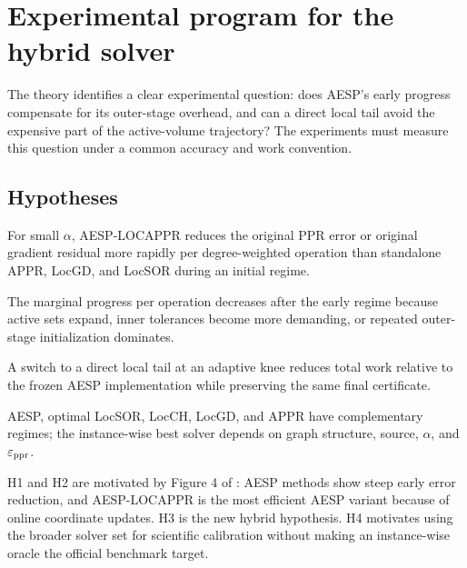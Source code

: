 \section{Experimental program for the hybrid solver}
\label{sec:experiments}

The theory identifies a clear experimental question: does AESP's early
progress compensate for its outer-stage overhead, and can a direct local tail
avoid the expensive part of the active-volume trajectory?  The experiments
must measure this question under a common accuracy and work convention.

\subsection{Hypotheses}

\begin{description}[leftmargin=2.9cm,style=nextline]
\item[H1: early AESP advantage.]
For small \(\alpha\), AESP-LOCAPPR reduces the original PPR error or original
gradient residual more rapidly per degree-weighted operation than standalone
APPR, LocGD, and LocSOR during an initial regime.

\item[H2: diminishing AESP returns.]
The marginal progress per operation decreases after the early regime because
active sets expand, inner tolerances become more demanding, or repeated
outer-stage initialization dominates.

\item[H3: hybrid dominance over AESP.]
A switch to a direct local tail at an adaptive knee reduces total work relative
to the frozen AESP implementation while preserving the same final certificate.

\item[H4: no universal standalone winner.]
AESP, optimal LocSOR, LocCH, LocGD, and APPR have complementary regimes; the
instance-wise best solver depends on graph structure, source, \(\alpha\), and
\(\varepsilon_{\mathrm{ppr}}\).
\end{description}

H1 and H2 are motivated by Figure 4 of \citet{huang2025accelerated}: AESP
methods show steep early error reduction, and AESP-LOCAPPR is the most
efficient AESP variant because of online coordinate updates.  H3 is the new
hybrid hypothesis.  H4 motivates using the broader solver set for scientific
calibration without making an instance-wise oracle the official benchmark
target.

